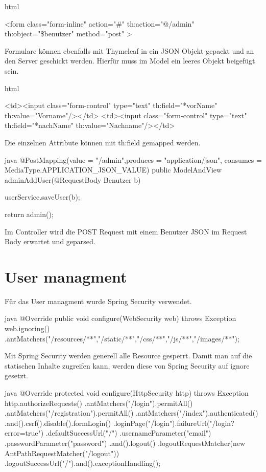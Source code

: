 \clearpage

\begin{code}[]{html}
	
	<form class="form-inline" action="#" th:action="@{/admin}" th:object="\${benutzer}" method="post" >
	
\end{code}

Formulare können ebenfalls mit Thymeleaf in ein JSON Objekt gepackt und an den Server geschickt werden. Hierfür muss im Model ein leeres Objekt beigefügt sein.


\begin{code}[]{html}

<td><input class="form-control" type="text" th:field="*{vorName}" th:value="Vorname"/></td>
<td><input class="form-control" type="text" th:field="*{nachName}" th:value="Nachname"/></td>
\end{code}

Die einzelnen Attribute können mit th:field gemapped werden.


\begin{code}[]{java}
	@PostMapping(value = "/admin",produces = "application/json", consumes = MediaType.APPLICATION_JSON_VALUE)
	public ModelAndView adminAddUser(@RequestBody Benutzer b){
		userService.saveUser(b);
		
		return admin();
	}
\end{code}

Im Controller wird die POST Request mit einem Benutzer JSON im Request Body erwartet und geparsed.

\section{User managment}

Für das User managment wurde Spring Security verwendet.

\begin{code}[]{java}
@Override
public void configure(WebSecurity web) throws Exception{
	web.ignoring()
	.antMatchers("/resources/**","/static/**","/css/**","/js/**","/images/**");
}
\end{code}

Mit Spring Security werden generell alle Resource gesperrt. Damit man auf die statischen Inhalte zugreifen kann, werden diese von Spring Security auf ignore gesetzt.

\begin{code}[]{java}
	@Override
	protected void configure(HttpSecurity http) throws Exception {
		http.authorizeRequests()
		.antMatchers("/login").permitAll()
		.antMatchers("/registration").permitAll()
		.antMatchers("/index").authenticated()
		.and().csrf().disable().formLogin()
		.loginPage("/login").failureUrl("/login?error=true")
		.defaultSuccessUrl("/")
		.usernameParameter("email")
		.passwordParameter("password")
		.and().logout()
		.logoutRequestMatcher(new AntPathRequestMatcher("/logout"))
		.logoutSuccessUrl("/").and().exceptionHandling();
	}
\end{code}
 
